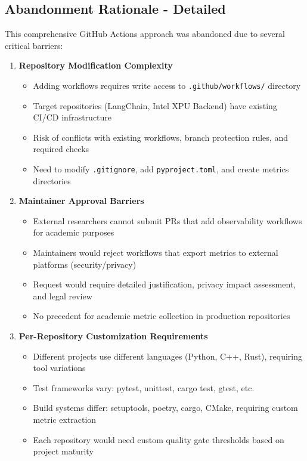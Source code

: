 \subsection{Abandonment Rationale - Detailed}

This comprehensive GitHub Actions approach was abandoned due to several critical barriers:

\begin{enumerate}
    \item \textbf{Repository Modification Complexity}
    \begin{itemize}
        \item Adding workflows requires write access to \texttt{.github/workflows/} directory
        \item Target repositories (LangChain, Intel XPU Backend) have existing CI/CD infrastructure
        \item Risk of conflicts with existing workflows, branch protection rules, and required checks
        \item Need to modify \texttt{.gitignore}, add \texttt{pyproject.toml}, and create metrics directories
    \end{itemize}

    \item \textbf{Maintainer Approval Barriers}
    \begin{itemize}
        \item External researchers cannot submit PRs that add observability workflows for academic purposes
        \item Maintainers would reject workflows that export metrics to external platforms (security/privacy)
        \item Request would require detailed justification, privacy impact assessment, and legal review
        \item No precedent for academic metric collection in production repositories
    \end{itemize}

    \item \textbf{Per-Repository Customization Requirements}
    \begin{itemize}
        \item Different projects use different languages (Python, C++, Rust), requiring tool variations
        \item Test frameworks vary: pytest, unittest, cargo test, gtest, etc.
        \item Build systems differ: setuptools, poetry, cargo, CMake, requiring custom metric extraction
        \item Each repository would need custom quality gate thresholds based on project maturity
    \end{itemize}


\end{enumerate}

